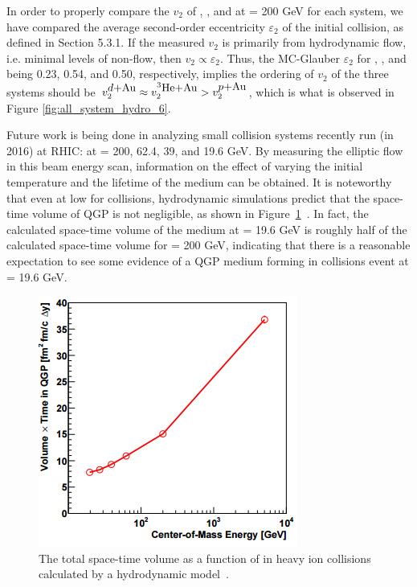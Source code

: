 In order to properly compare the $v_2$ of \pau, \dau, and \hau at \sqsn = 200 GeV for each system, we have compared the average second-order eccentricity $\varepsilon_2$ of the initial collision, as defined in Section 5.3.1. If the measured $v_2$ is primarily from hydrodynamic flow, i.e. minimal levels of non-flow, then $v_2 \propto \varepsilon_2$. Thus, the MC-Glauber $\varepsilon_2$ for \pau, \dau, and \hau being 0.23, 0.54, and 0.50, respectively, implies the ordering of $v_2$ of the three systems should be $v_2^{\mbox{$d$+Au}} \approx v_2^{\mbox{$^3\text{He}$+Au}} > v_2^{\mbox{$p$+Au}}$, which is what is observed in Figure \ref{fig:all_system_hydro_6}.

Future work is being done in analyzing small collision systems recently run (in 2016) at RHIC: \dau at \sqsn = 200, 62.4, 39, and 19.6 GeV. By measuring the elliptic flow in this \dau beam energy scan, information on the effect of varying the initial temperature and the lifetime of the medium can be obtained. It is noteworthy that even at low \sqsn for \dau collisions, hydrodynamic simulations predict that the space-time volume of QGP is not negligible, as shown in Figure~\ref{fig:size_or_mediumcalc}~\cite{PhysRevC.93.044910}. In fact, the calculated space-time volume of the medium at \sqsn = 19.6 GeV is roughly half of the calculated space-time volume for \sqsn = 200 GeV, indicating that there is a reasonable expectation to see some evidence of a QGP medium forming in \dau collisions event at \sqsn = 19.6 GeV.

\begin{figure}[!ht]
\begin{center}
\includegraphics[width=0.5\linewidth]{figs/size_of_medium_calculation.png}
\caption{The total space-time volume as a function of \sqsn in heavy ion collisions calculated by a hydrodynamic model~\cite{PhysRevC.93.044910}.}
\label{fig:size_or_mediumcalc}
\end{center}
\end{figure}

